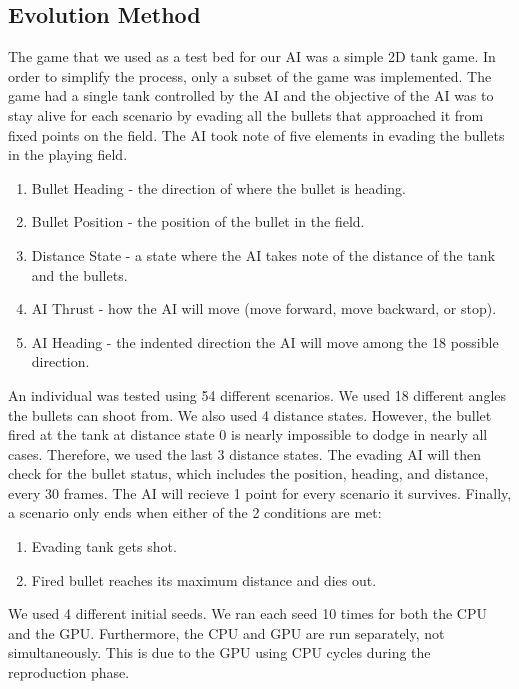 \subsection{Evolution Method}
The game that we used as a test bed for our AI was a simple 2D tank game.
In order to simplify the process, only a subset of the game was implemented.
The game had a single tank controlled by the AI and the objective of the AI
was to stay alive for each scenario by evading all the bullets that approached
it from fixed points on the field. The AI took note of five elements in evading the
bullets in the playing field.

\begin{enumerate}
 \item Bullet Heading - the direction of where the bullet is heading.
 \item Bullet Position - the position of the bullet in the field.
 \item Distance State - a state where the AI takes note of the distance 
of the tank and the bullets.
 \item AI Thrust - how the AI will move (move forward, move backward, or stop).
 \item AI Heading - the indented direction the AI will move among the 18
possible direction.
\end{enumerate}

An individual was tested using 54 different scenarios. We used 18 different angles 
the bullets can shoot from. We also used 4 distance states. However, the bullet 
fired at the tank at distance state 0 is nearly impossible to dodge in nearly all 
cases. Therefore, we used the last 3 distance states. The evading AI will then check
for the bullet status, which includes the position, heading, and distance, every 30 
frames. The AI will recieve 1 point for every scenario it survives. Finally, a 
scenario only ends when either of the 2 conditions are met:

\begin{enumerate}
 \item Evading tank gets shot.
 \item Fired bullet reaches its maximum distance and dies out.
\end{enumerate}

We used 4 different initial seeds. We ran each seed 10 times for both the CPU and 
the GPU. Furthermore, the CPU and GPU are run separately, not simultaneously. This
is due to the GPU using CPU cycles during the reproduction phase.

